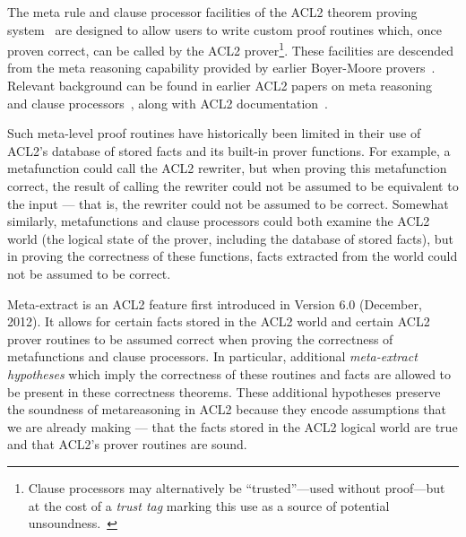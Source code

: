 The meta rule and clause processor facilities
of the ACL2 theorem proving system~\cite{acl2:home}
are designed to allow
users to write custom proof routines which, once proven
correct, can be called by the ACL2 prover\footnote{
  Clause processors may alternatively be ``trusted''---used without proof---but at the
  cost of a {\em trust tag} marking this use as a source of potential
  unsoundness.~\cite{trusted-cl-proc}}.
These facilities are descended from the meta reasoning capability
provided by earlier Boyer-Moore provers~\cite{meta}.  Relevant
background can be found in earlier ACL2 papers on meta
reasoning~\cite{meta-05} and clause processors~\cite{trusted-cl-proc},
along with ACL2 documentation~\cite{acl2:doc}.

Such meta-level proof routines have historically been limited in their use of
ACL2's database of stored facts and its built-in prover functions.
For example, a metafunction could call the ACL2 rewriter, but when
proving this metafunction correct, the result of calling the rewriter
could not be assumed to be equivalent to the input --- that is, the
rewriter could not be assumed to be correct.  Somewhat similarly,
metafunctions and clause processors could both examine the ACL2 world
(the logical state of the prover, including the database of stored
facts), but in proving the correctness of these functions, facts
extracted from the world could not be assumed to be correct.

Meta-extract is an ACL2 feature first introduced in Version 6.0
(December, 2012).  It allows for certain facts stored in the ACL2
world and certain ACL2 prover routines to be assumed
correct when proving the correctness of metafunctions and clause
processors.  In particular, additional \textit{meta-extract hypotheses}
which imply the correctness of these routines and facts are allowed to
be present in these correctness theorems. These additional hypotheses
preserve the soundness of metareasoning in ACL2 because they encode
assumptions that we are already
making --- that the facts stored in the ACL2 logical world are true
and that ACL2's prover routines are sound.

